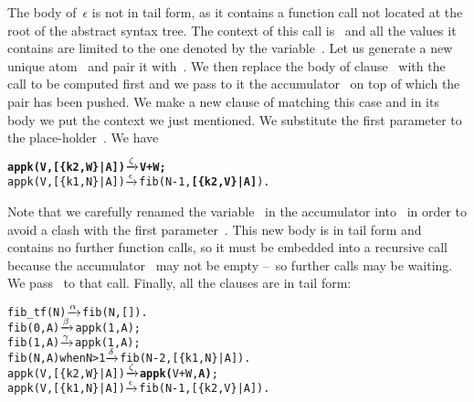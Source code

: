 \begin{enumerate}
    The body of~\(\epsilon\) is not in tail form, as
    it contains a function call not located at the root of the
    abstract syntax tree. The context of this call
    is~ and all the values it
    contains are limited to the one denoted by the
    variable~. Let us generate a new unique
    atom~ and pair it with~. We then replace
    the body of clause~\clause{\epsilon} with the call to be computed
    first and we pass to it the accumulator~ on top of
    which the pair has been pushed. We make a new clause of
     matching this case and in its body we put the
    context we just mentioned. We substitute the first parameter to
    the place\hyp{}holder~\erlcode{\textvisiblespace}. We have
\begin{alltt}
\textbf{appk(V,[\{k2,W\}|A]) \(\smashedrightarrow{\zeta}\) V + W;}
appk(V,[\{k1,N\}|A]) \(\smashedrightarrow{\epsilon}\) fib(N-1,\textbf{[\{k2,V\}|A]}).
\end{alltt}
    Note that we carefully renamed the variable~ in the
    accumulator into~ in order to avoid a clash with the
    first parameter~. This new body  is in
    tail form and contains no further function calls, so it must be
    embedded into a recursive call because the accumulator~
    may not be empty --~so further calls may be waiting. We
    pass~ to that call. Finally, all the clauses are in
    tail form:
\begin{alltt}
fib\_tf(N)           \(\smashedrightarrow{\alpha}\) fib(N,[]).
fib(0,A)            \(\smashedrightarrow{\beta}\) appk(1,A);
fib(1,A)            \(\smashedrightarrow{\gamma}\) appk(1,A);
fib(N,A) when N > 1 \(\smashedrightarrow{\delta}\) fib(N-2,[\{k1,N\}|A]).
appk(V,[\{k2,W\}|A])  \(\smashedrightarrow{\zeta}\) \textbf{appk(}V+W,\textbf{A)};
appk(V,[\{k1,N\}|A])  \(\smashedrightarrow{\epsilon}\) fib(N-1,[\{k2,V\}|A]).
\end{alltt}


\end{enumerate}
